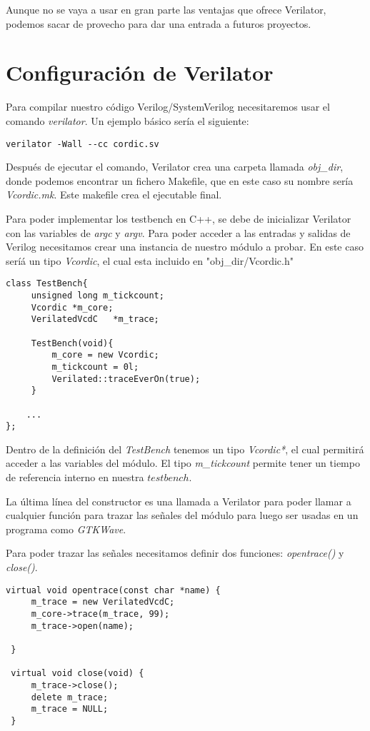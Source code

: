 Aunque no se vaya a usar en gran parte las ventajas que ofrece Verilator, podemos sacar de provecho para dar una entrada a futuros proyectos.

\section{Configuración de Verilator}
Para compilar nuestro código Verilog/SystemVerilog necesitaremos usar el comando \textit{verilator}. Un ejemplo básico sería el siguiente:

\begin{lstlisting}
verilator -Wall --cc cordic.sv
\end{lstlisting}

Después de ejecutar el comando, Verilator crea una carpeta llamada \textit{obj\_dir}, donde podemos encontrar un fichero Makefile, que en este caso su nombre sería \textit{Vcordic.mk}. Este makefile crea el ejecutable final.

Para poder implementar los testbench en C++, se debe de inicializar Verilator con las variables de \textit{argc} y \textit{argv}. Para poder acceder a las entradas y salidas de Verilog necesitamos crear una instancia de nuestro módulo a probar. En este caso seríá un tipo \textit{Vcordic}, el cual esta incluido en "obj\_dir/Vcordic.h"

\begin{lstlisting}[caption={Definición de una TestBench de Verilator}] 
class TestBench{
     unsigned long m_tickcount;
     Vcordic *m_core;
     VerilatedVcdC   *m_trace;
     
     TestBench(void){
         m_core = new Vcordic;
         m_tickcount = 0l;
         Verilated::traceEverOn(true);
     }
     
	...
};
\end{lstlisting}

Dentro de la definición del \textit{TestBench} tenemos un tipo \textit{Vcordic*}, el cual permitirá acceder a las variables del módulo. El tipo \textit{m\_tickcount} permite tener un tiempo de referencia interno en nuestra $testbench$.

La última línea del constructor es una llamada a Verilator para poder llamar a cualquier función para trazar las señales del módulo para luego ser usadas en un programa como \textit{GTKWave}.

Para poder trazar las señales necesitamos definir dos funciones: \textit{opentrace()} y \textit{close()}.

\begin{lstlisting}[caption={Definición de funciones para trazar la simulación.}]
 virtual void opentrace(const char *name) {
     m_trace = new VerilatedVcdC;
     m_core->trace(m_trace, 99);
     m_trace->open(name);

 }

 virtual void close(void) {
     m_trace->close();
     delete m_trace;
     m_trace = NULL;
 }
\end{lstlisting}

